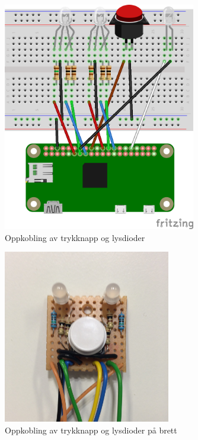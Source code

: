 \begin{figure}
\includegraphics[width=0.75\textwidth, center]{fig/prototype/breadbord}
\caption{Oppkobling av trykknapp og lysdioder}
\label{fig:breadboard}
\end{figure}

\begin{figure}
\includegraphics[width=0.65\textwidth, center]{fig/prototype/ekte_knappleds}
\caption{Oppkobling av trykknapp og lysdioder på brett}
\label{fig:brett}
\end{figure}

